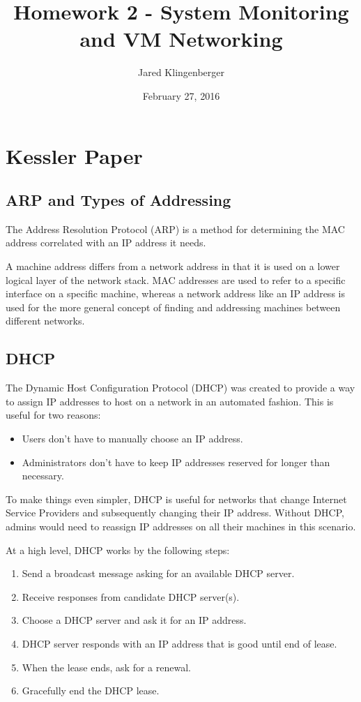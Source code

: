 \documentclass{article}
\title{Homework 2 - System Monitoring and VM Networking}
\author{Jared Klingenberger}
\date{February 27, 2016}
\begin{document}
\maketitle

\lstlistoflistings

\section{Kessler Paper}

\subsection{ARP and Types of Addressing}

The Address Resolution Protocol (ARP) is a method for determining the MAC
address correlated with an IP address it needs.

A machine address differs from a network address in that it is used on a lower
logical layer of the network stack. MAC addresses are used to refer to a
specific interface on a specific machine, whereas a network address like an IP
address is used for the more general concept of finding and addressing
machines between different networks.

\subsection{DHCP}

The Dynamic Host Configuration Protocol (DHCP) was created to provide a way
to assign IP addresses to host on a network in an automated fashion. This is
useful for two reasons:

\begin{itemize}
    \item Users don't have to manually choose an IP address.
    \item Administrators don't have to keep IP addresses reserved for longer
          than necessary.
\end{itemize}

To make things even simpler, DHCP is useful for networks that change Internet
Service Providers and subsequently changing their IP address. Without DHCP,
admins would need to reassign IP addresses on all their machines in this
scenario.

At a high level, DHCP works by the following steps:

\begin{enumerate}
    \item Send a broadcast message asking for an available DHCP server.
    \item Receive responses from candidate DHCP server(s).
    \item Choose a DHCP server and ask it for an IP address.
    \item DHCP server responds with an IP address that is good until end of
          lease.
    \item When the lease ends, ask for a renewal.
    \item Gracefully end the DHCP lease.
\end{enumerate}
\end{document}

